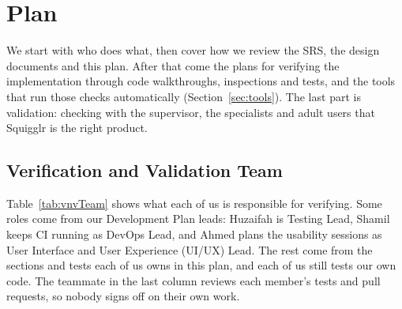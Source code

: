 \documentclass[12pt, titlepage]{article}
\begin{document}
\section{Plan}
\label{sec:plan}

We start with who does what, then cover how we review the SRS, the design
documents and this plan. After that come the plans for verifying the
implementation through code walkthroughs, inspections and tests, and the tools
that run those checks automatically (Section~\ref{sec:tools}). The last part
is validation: checking with the supervisor, the specialists and adult users
that Squigglr is the right product.

\subsection{Verification and Validation Team}

\label{sec:vnvTeam}

Table~\ref{tab:vnvTeam} shows what each of us is responsible for verifying.
Some roles come from our Development Plan leads: Huzaifah is Testing Lead,
Shamil keeps CI running as DevOps Lead, and Ahmed plans the usability sessions
as User Interface and User Experience (UI/UX) Lead. The rest come from the
sections and tests each of us owns in this plan, and each of us still tests
our own code. The teammate in the last column reviews each member's tests and
pull requests, so nobody signs off on their own work.
\end{document}
